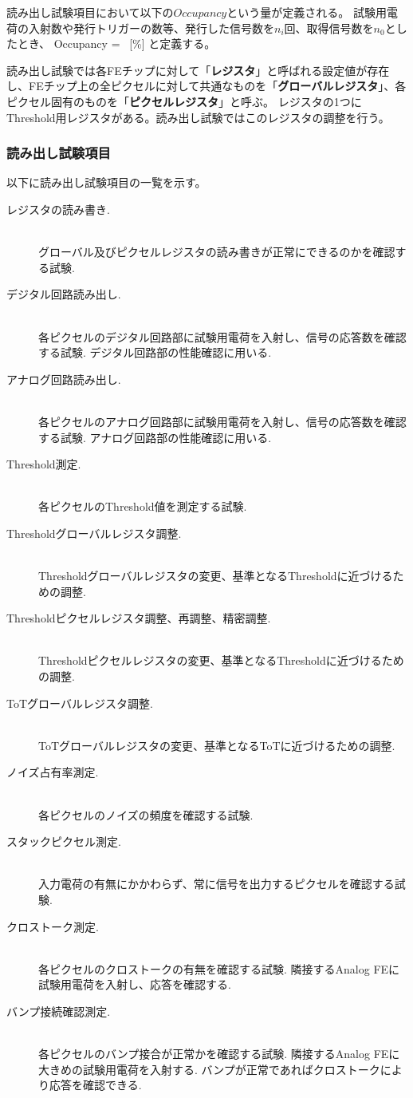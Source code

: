 読み出し試験項目において以下の$Occupancy$という量が定義される。
試験用電荷の入射数や発行トリガーの数等、発行した信号数を$n_i$回、取得信号数を$n_0$としたとき、
\bbb
\label{occupancy}
Occupancy =  ~[\%]
\eee
と定義する。

読み出し試験では各FEチップに対して「\textbf{レジスタ}」と呼ばれる設定値が存在し、FEチップ上の全ピクセルに対して共通なものを「\textbf{グローバルレジスタ}」、各ピクセル固有のものを「\textbf{ピクセルレジスタ}」と呼ぶ。
レジスタの1つにThreshold用レジスタがある。読み出し試験ではこのレジスタの調整を行う。

\clearpage
\subsubsection{読み出し試験項目}
以下に読み出し試験項目の一覧を示す。
\begin{description}
  \item[レジスタの読み書き.]\mbox{}\\
グローバル及びピクセルレジスタの読み書きが正常にできるのかを確認する試験.
  \item[デジタル回路読み出し.]\mbox{} \\
各ピクセルのデジタル回路部に試験用電荷を入射し、信号の応答数を確認する試験. デジタル回路部の性能確認に用いる.
  \item[アナログ回路読み出し.]\mbox{}\\
各ピクセルのアナログ回路部に試験用電荷を入射し、信号の応答数を確認する試験. アナログ回路部の性能確認に用いる.
  \item[Threshold測定.]\mbox{}\\
各ピクセルのThreshold値を測定する試験.
  \item[Thresholdグローバルレジスタ調整.]\mbox{}\\
Thresholdグローバルレジスタの変更、基準となるThresholdに近づけるための調整.
  \item[Thresholdピクセルレジスタ調整、再調整、精密調整.]\mbox{}\\
Thresholdピクセルレジスタの変更、基準となるThresholdに近づけるための調整.
  \item[ToTグローバルレジスタ調整.]\mbox{}\\
ToTグローバルレジスタの変更、基準となるToTに近づけるための調整.
  \item[ノイズ占有率測定.]\mbox{}\\
各ピクセルのノイズの頻度を確認する試験.
  \item[スタックピクセル測定.]\mbox{}\\
入力電荷の有無にかかわらず、常に信号を出力するピクセルを確認する試験.
  \item[クロストーク測定.]\mbox{}\\
各ピクセルのクロストークの有無を確認する試験. 隣接するAnalog FEに試験用電荷を入射し、応答を確認する.
  \item[バンプ接続確認測定.]\mbox{}\\
各ピクセルのバンプ接合が正常かを確認する試験. 隣接するAnalog FEに大きめの試験用電荷を入射する. バンプが正常であればクロストークにより応答を確認できる.
\end{description}

